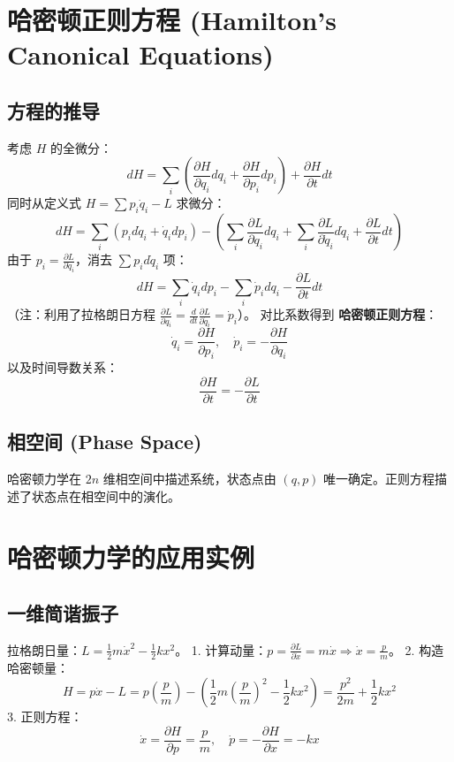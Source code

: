 \documentclass[11pt,a4paper]{article}
\begin{document}
\section{哈密顿正则方程 (Hamilton's Canonical Equations)}

\subsection{方程的推导}
考虑 $H$ 的全微分：
\[ dH = \sum_i \left( \frac{\partial H}{\partial q_i} dq_i + \frac{\partial H}{\partial p_i} dp_i \right) + \frac{\partial H}{\partial t} dt \]
同时从定义式 $H = \sum p_i \dot{q}_i - L$ 求微分：
\[ dH = \sum_i (p_i d\dot{q}_i + \dot{q}_i dp_i) - \left( \sum_i \frac{\partial L}{\partial q_i} dq_i + \sum_i \frac{\partial L}{\partial \dot{q}_i} d\dot{q}_i + \frac{\partial L}{\partial t} dt \right) \]
由于 $p_i = \frac{\partial L}{\partial \dot{q}_i}$，消去 $\sum p_i d\dot{q}_i$ 项：
\[ dH = \sum_i \dot{q}_i dp_i - \sum_i \dot{p}_i dq_i - \frac{\partial L}{\partial t} dt \]
（注：利用了拉格朗日方程 $\frac{\partial L}{\partial q_i} = \frac{d}{dt}\frac{\partial L}{\partial \dot{q}_i} = \dot{p}_i$）。
对比系数得到 \textbf{哈密顿正则方程}：
\[ \boxed{\dot{q}_i = \frac{\partial H}{\partial p_i}, \quad \dot{p}_i = -\frac{\partial H}{\partial q_i}} \]
以及时间导数关系：
\[ \frac{\partial H}{\partial t} = -\frac{\partial L}{\partial t} \]

\subsection{相空间 (Phase Space)}
哈密顿力学在 $2n$ 维相空间中描述系统，状态点由 $(q, p)$ 唯一确定。正则方程描述了状态点在相空间中的演化。

\section{哈密顿力学的应用实例}

\subsection{一维简谐振子}
拉格朗日量：$L = \frac{1}{2}m\dot{x}^2 - \frac{1}{2}kx^2$。
1. 计算动量：$p = \frac{\partial L}{\partial \dot{x}} = m\dot{x} \Rightarrow \dot{x} = \frac{p}{m}$。
2. 构造哈密顿量：
\[ H = p\dot{x} - L = p(\frac{p}{m}) - \left( \frac{1}{2}m(\frac{p}{m})^2 - \frac{1}{2}kx^2 \right) = \frac{p^2}{2m} + \frac{1}{2}kx^2 \]
3. 正则方程：
\[ \dot{x} = \frac{\partial H}{\partial p} = \frac{p}{m}, \quad \dot{p} = -\frac{\partial H}{\partial x} = -kx \]
\end{document}
